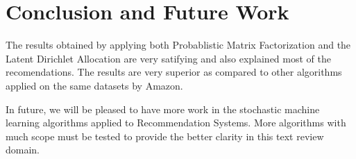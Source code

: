 \chapter{Conclusion and Future Work}

The results obtained by applying both Probablistic Matrix Factorization and the Latent Dirichlet Allocation are very satifying and also explained most of the recomendations. The results are very superior as compared to other algorithms applied on the same datasets by Amazon. 

In future, we will be pleased to have more work in the stochastic machine learning algorithms applied to Recommendation Systems. More algorithms with much scope must be tested to provide the better clarity in this text review domain.



